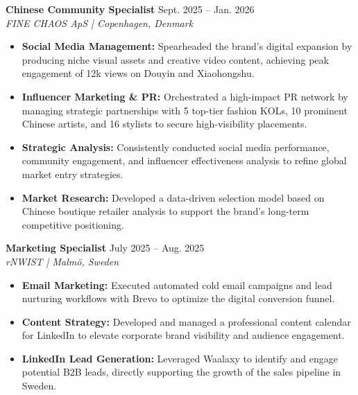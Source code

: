 \documentclass[a4paper,10pt]{article}
\begin{document}
\vspace{6pt}
\textbf{Chinese Community Specialist} \hfill Sept. 2025 -- Jan. 2026\\
\textit{FINE CHAOS ApS | Copenhagen, Denmark}
\begin{itemize}[noitemsep]
  \item \textbf{Social Media Management:} Spearheaded the brand's digital expansion by producing niche visual assets and creative video content, achieving peak engagement of 12k views on Douyin and Xiaohongshu.
  \item \textbf{Influencer Marketing \& PR:} Orchestrated a high-impact PR network by managing strategic partnerships with 5 top-tier fashion KOLs, 10 prominent Chinese artists, and 16 stylists to secure high-visibility placements.
  \item \textbf{Strategic Analysis:} Consistently conducted social media performance, community engagement, and influencer effectiveness analysis to refine global market entry strategies.
  \item \textbf{Market Research:} Developed a data-driven selection model based on Chinese boutique retailer analysis to support the brand's long-term competitive positioning.
\end{itemize}

\vspace{6pt}
\textbf{Marketing Specialist} \hfill July 2025 -- Aug. 2025\\
\textit{rNWIST | Malm\"{o}, Sweden}
\begin{itemize}[noitemsep]
  \item \textbf{Email Marketing:} Executed automated cold email campaigns and lead nurturing workflows with Brevo to optimize the digital conversion funnel.
  \item \textbf{Content Strategy:} Developed and managed a professional content calendar for LinkedIn to elevate corporate brand visibility and audience engagement.
  \item \textbf{LinkedIn Lead Generation:} Leveraged Waalaxy to identify and engage potential B2B leads, directly supporting the growth of the sales pipeline in Sweden.
\end{itemize}
\end{document}
